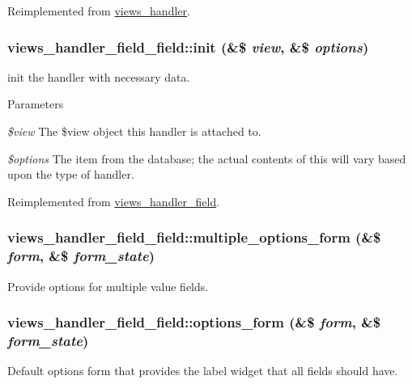 Reimplemented from \hyperlink{classviews__handler_a73b3d91e7c3ac0ccbe3541c518acf41f}{views\_\-handler}.\hypertarget{classviews__handler__field__field_ad700213e1c6ed422441db57cf58f47c6}{
\subsubsection[{init}]{\setlength{\rightskip}{0pt plus 5cm}views\_\-handler\_\-field\_\-field::init (\&\$ {\em view}, \/  \&\$ {\em options})}}
\label{classviews__handler__field__field_ad700213e1c6ed422441db57cf58f47c6}
init the handler with necessary data. 
\begin{DoxyParams}{Parameters}
\item[{\em \$view}]The \$view object this handler is attached to. \item[{\em \$options}]The item from the database; the actual contents of this will vary based upon the type of handler. \end{DoxyParams}


Reimplemented from \hyperlink{classviews__handler__field_a3a290c7df3ead81e5cd244ad5335b1cc}{views\_\-handler\_\-field}.\hypertarget{classviews__handler__field__field_aab581f18035fc79e759600f48f9dc179}{
\subsubsection[{multiple\_\-options\_\-form}]{\setlength{\rightskip}{0pt plus 5cm}views\_\-handler\_\-field\_\-field::multiple\_\-options\_\-form (\&\$ {\em form}, \/  \&\$ {\em form\_\-state})}}
\label{classviews__handler__field__field_aab581f18035fc79e759600f48f9dc179}
Provide options for multiple value fields. \hypertarget{classviews__handler__field__field_a2548b1c9e1940efd2e12bf4702cdb3fb}{
\subsubsection[{options\_\-form}]{\setlength{\rightskip}{0pt plus 5cm}views\_\-handler\_\-field\_\-field::options\_\-form (\&\$ {\em form}, \/  \&\$ {\em form\_\-state})}}
\label{classviews__handler__field__field_a2548b1c9e1940efd2e12bf4702cdb3fb}
Default options form that provides the label widget that all fields should have. 

